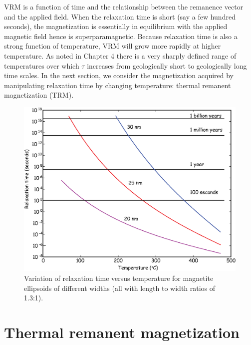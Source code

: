  VRM is a function of time and the relationship between the remanence vector and the applied field.  When the relaxation time is short (say a few hundred seconds), the magnetization is essentially in equilibrium with the applied magnetic field hence is superparamagnetic.  
  Because relaxation time  is also a strong function of temperature, VRM will grow more rapidly at higher temperature.    As noted in Chapter 4 there is a very sharply
defined range of temperatures over which $\tau $ increases from geologically
short to geologically long time scales.    In the next section, we consider the magnetization acquired by manipulating relaxation time by changing temperature: 
thermal remanent magnetization (TRM).    


\begin{figure}[h!tb]
\centering  \includegraphics[width=10 cm]{EPSfiles/tauT.eps}
\caption{Variation of relaxation time versus temperature for magnetite ellipsoids of different widths (all with length to width ratios of 1.3:1).  }
\label{fig:tauT}
\end{figure}

 
\section {Thermal remanent magnetization}
\label{sect:trm}


